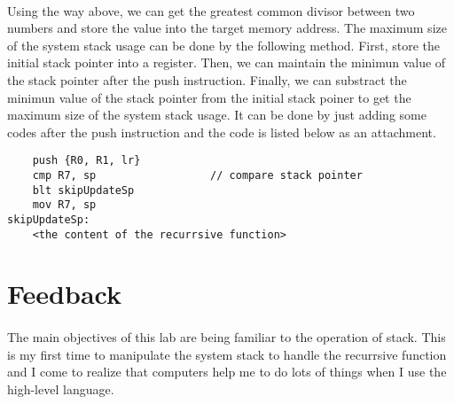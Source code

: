\paragraph{}
Using the way above, we can get the greatest common divisor between two numbers and store the value into the target memory address. The maximum size of the system stack usage can be done by the following method. First, store the initial stack pointer into a register. Then, we can maintain the minimun value of the stack pointer after the push instruction. Finally, we can substract the minimun value of the stack pointer from the initial stack poiner to get the maximum size of the system stack usage. It can be done by just adding some codes after the push instruction and the code is listed below as an attachment.
\begin{lstlisting}
    push {R0, R1, lr}
    cmp R7, sp                  // compare stack pointer
    blt skipUpdateSp
    mov R7, sp
skipUpdateSp:
    <the content of the recurrsive function>
\end{lstlisting}
\section{Feedback}
\paragraph{}
The main objectives of this lab are being familiar to the operation of stack. This is my first time to manipulate the system stack to handle the recurrsive function and I come to realize that computers help me to do lots of things when I use the high-level language.
